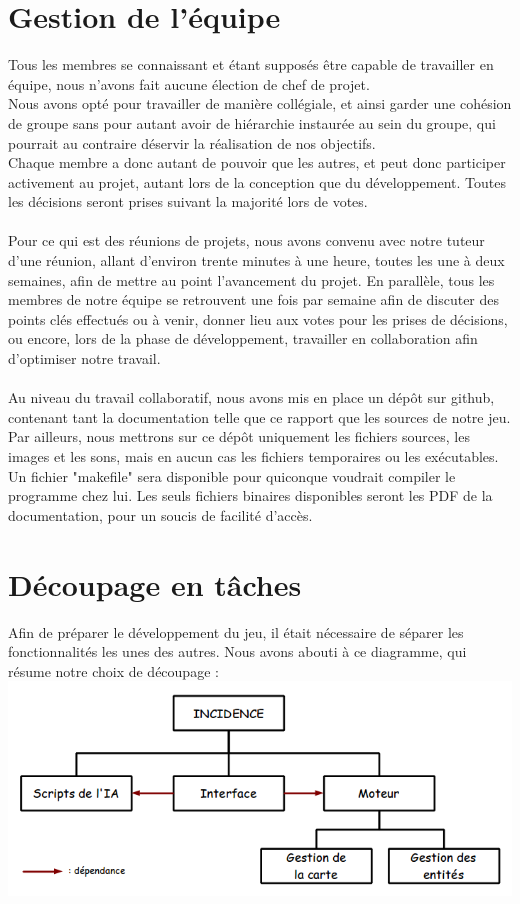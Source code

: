 \documentclass[a4paper]{article}
\newcommand{\alinea}{\hspace*{0.5cm}}
\begin{document}
    \section{Gestion de l'équipe}
      \alinea Tous les membres se connaissant et étant supposés être capable de travailler en équipe, nous n'avons fait aucune élection de chef de projet.\\
      \alinea Nous avons opté pour travailler de manière collégiale, et ainsi garder une cohésion de groupe sans pour autant avoir de hiérarchie instaurée au sein du groupe, qui pourrait au contraire déservir la réalisation de nos objectifs.\\
      \alinea Chaque membre a donc autant de pouvoir que les autres, et peut donc participer activement au projet, autant lors de la conception que du développement. Toutes les décisions seront prises suivant la majorité lors de votes.\\\\
      \alinea Pour ce qui est des réunions de projets, nous avons convenu avec notre tuteur d'une réunion, allant d'environ trente minutes à une heure, toutes les une à deux semaines, afin de mettre au point l'avancement du projet. En parallèle, tous les membres de notre équipe se retrouvent une fois par semaine afin de discuter des points clés effectués ou à venir, donner lieu aux votes pour les prises de décisions, ou encore, lors de la phase de développement, travailler en collaboration afin d'optimiser notre travail.\\\\
      \alinea Au niveau du travail collaboratif, nous avons mis en place un dépôt sur github, contenant tant la documentation telle que ce rapport que les sources de notre jeu. Par ailleurs, nous mettrons sur ce dépôt uniquement les fichiers sources, les images et les sons, mais en aucun cas les fichiers temporaires ou les exécutables. Un fichier "makefile" sera disponible pour quiconque voudrait compiler le programme chez lui. Les seuls fichiers binaires disponibles seront les PDF de la documentation, pour un soucis de facilité d'accès.

    \section{Découpage en tâches}
      \alinea Afin de préparer le développement du jeu, il était nécessaire de séparer les fonctionnalités les unes des autres. Nous avons abouti à ce diagramme, qui résume notre choix de découpage :\\
      \includegraphics[scale=0.5]{img/DiagrammeDecoupageProjet.png}
      \label{DiagDecoupage}
\end{document}

